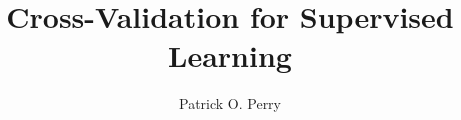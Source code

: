 \documentclass[12pt]{report}
\title{Cross-Validation for Supervised Learning}
\author{Patrick O. Perry}
\newcommand{\dirsep}{/}
\newcommand{\dirprefix}{}
\newcommand{\thesischapter}[1]{\dirprefix #1\dirsep #1}
\newcommand{\includechapter}[1]{
    \graphicspath{{\dirprefix #1\dirsep plots\dirsep}}
    }
}
\begin{document}
 


%


%


\includechapter{multivariate}
\includechapter{lowrank}


\appendix

\includechapter{weighted-sums}



\end{document}
